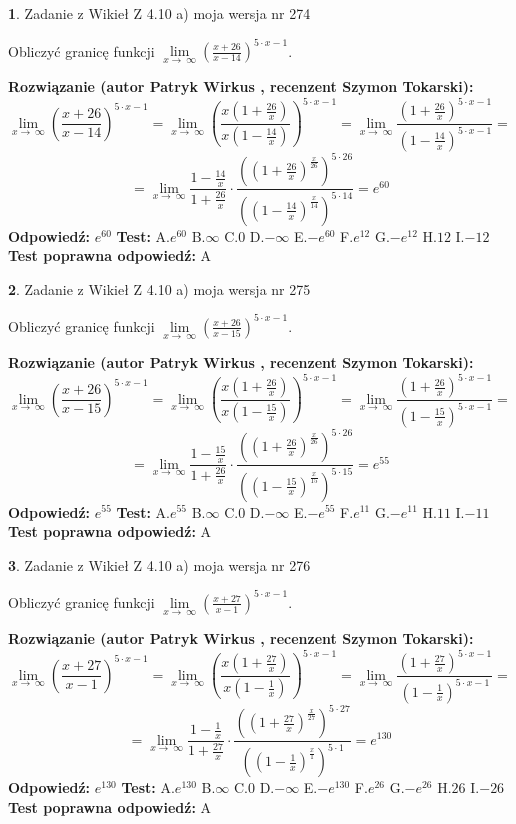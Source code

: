 \documentclass[12pt, a4paper]{article}
\theoremstyle{definition} %
\newtheorem{zad}{}
\newcommand{\zadStart}[1]{\begin{zad}#1\newline}
\newcommand{\zadStop}{\end{zad}}
\newcommand{\rozwStart}[2]{\noindent \textbf{Rozwiązanie (autor #1 , recenzent #2): }\newline}
\newcommand{\rozwStop}{\newline}
\newcommand{\odpStart}{\noindent \textbf{Odpowiedź:}\newline}
\newcommand{\odpStop}{\newline}
\newcommand{\testStart}{\noindent \textbf{Test:}\newline}
\newcommand{\testStop}{\newline}
\newcommand{\kluczStart}{\noindent \textbf{Test poprawna odpowiedź:}\newline}
\newcommand{\kluczStop}{\newline}
\begin{document}
\zadStart{Zadanie z Wikieł Z 4.10 a) moja wersja nr 274}

Obliczyć granicę funkcji  $\lim\limits_{x\to\ \infty}(\frac{x+26}{x-14})^{5\cdot x-1}$.
\zadStop
\rozwStart{Patryk Wirkus}{Szymon Tokarski}
$$\lim\limits_{x\to\ \infty}(\frac{x+26}{x-14})^{5\cdot x-1} = \lim\limits_{x\to\ \infty}(\frac{x(1+\frac{26}{x})}{x(1-\frac{14}{x})})^{5\cdot x-1}=\lim\limits_{x\to\ \infty}\frac{(1+\frac{26}{x})^{5\cdot x-1}}{(1-\frac{14}{x})^{5\cdot x-1}}=$$
$$=\lim\limits_{x\to\ \infty}\frac{1-\frac{14}{x}}{1+\frac{26}{x}}\cdot\frac{((1+\frac{26}{x})^{\frac{x}{26}})^{5\cdot26}}{((1-\frac{14}{x})^{\frac{x}{14}})^{5\cdot14}}=e^{60}$$
\rozwStop
\odpStart
$e^{60}$
\odpStop
\testStart
A.$e^{60}$ B.$\infty$ C.$0$ D.$-\infty$ E.$-e^{60}$
F.$e^{12}$ G.$-e^{12}$
H.$12$
I.$-12$
\testStop
\kluczStart
A
\kluczStop



\zadStart{Zadanie z Wikieł Z 4.10 a) moja wersja nr 275}

Obliczyć granicę funkcji  $\lim\limits_{x\to\ \infty}(\frac{x+26}{x-15})^{5\cdot x-1}$.
\zadStop
\rozwStart{Patryk Wirkus}{Szymon Tokarski}
$$\lim\limits_{x\to\ \infty}(\frac{x+26}{x-15})^{5\cdot x-1} = \lim\limits_{x\to\ \infty}(\frac{x(1+\frac{26}{x})}{x(1-\frac{15}{x})})^{5\cdot x-1}=\lim\limits_{x\to\ \infty}\frac{(1+\frac{26}{x})^{5\cdot x-1}}{(1-\frac{15}{x})^{5\cdot x-1}}=$$
$$=\lim\limits_{x\to\ \infty}\frac{1-\frac{15}{x}}{1+\frac{26}{x}}\cdot\frac{((1+\frac{26}{x})^{\frac{x}{26}})^{5\cdot26}}{((1-\frac{15}{x})^{\frac{x}{15}})^{5\cdot15}}=e^{55}$$
\rozwStop
\odpStart
$e^{55}$
\odpStop
\testStart
A.$e^{55}$ B.$\infty$ C.$0$ D.$-\infty$ E.$-e^{55}$
F.$e^{11}$ G.$-e^{11}$
H.$11$
I.$-11$
\testStop
\kluczStart
A
\kluczStop



\zadStart{Zadanie z Wikieł Z 4.10 a) moja wersja nr 276}

Obliczyć granicę funkcji  $\lim\limits_{x\to\ \infty}(\frac{x+27}{x-1})^{5\cdot x-1}$.
\zadStop
\rozwStart{Patryk Wirkus}{Szymon Tokarski}
$$\lim\limits_{x\to\ \infty}(\frac{x+27}{x-1})^{5\cdot x-1} = \lim\limits_{x\to\ \infty}(\frac{x(1+\frac{27}{x})}{x(1-\frac{1}{x})})^{5\cdot x-1}=\lim\limits_{x\to\ \infty}\frac{(1+\frac{27}{x})^{5\cdot x-1}}{(1-\frac{1}{x})^{5\cdot x-1}}=$$
$$=\lim\limits_{x\to\ \infty}\frac{1-\frac{1}{x}}{1+\frac{27}{x}}\cdot\frac{((1+\frac{27}{x})^{\frac{x}{27}})^{5\cdot27}}{((1-\frac{1}{x})^{\frac{x}{1}})^{5\cdot1}}=e^{130}$$
\rozwStop
\odpStart
$e^{130}$
\odpStop
\testStart
A.$e^{130}$ B.$\infty$ C.$0$ D.$-\infty$ E.$-e^{130}$
F.$e^{26}$ G.$-e^{26}$
H.$26$
I.$-26$
\testStop
\kluczStart
A
\kluczStop
\end{document}
